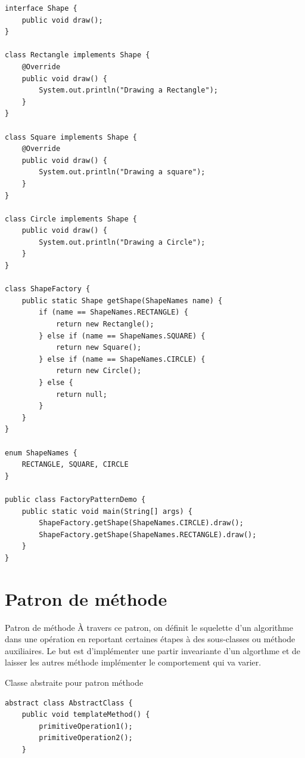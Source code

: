 \documentclass[16pt]{report}
\begin{document}
\begin{multicols*}{2}
\begin{lstlisting}[style=JavaDraculaWhite]
 interface Shape {
    public void draw();
}

class Rectangle implements Shape {
    @Override
    public void draw() {
        System.out.println("Drawing a Rectangle");
    }
}

class Square implements Shape {
    @Override
    public void draw() {
        System.out.println("Drawing a square");
    }
}

class Circle implements Shape {
    public void draw() {
        System.out.println("Drawing a Circle");
    }
}

class ShapeFactory {
    public static Shape getShape(ShapeNames name) {
        if (name == ShapeNames.RECTANGLE) {
            return new Rectangle();
        } else if (name == ShapeNames.SQUARE) {
            return new Square();
        } else if (name == ShapeNames.CIRCLE) {
            return new Circle();
        } else {
            return null;
        }
    }
}

enum ShapeNames {
    RECTANGLE, SQUARE, CIRCLE
}

public class FactoryPatternDemo {
    public static void main(String[] args) {
        ShapeFactory.getShape(ShapeNames.CIRCLE).draw();
        ShapeFactory.getShape(ShapeNames.RECTANGLE).draw();
    }
}    
\end{lstlisting}

        \section{Patron de méthode}
    
        \begin{Concept}{Patron de méthode}{}
            À travers ce patron, on \textcolor{myb}{définit le squelette} d'un algorithme dans une 
            opération en \textcolor{myb}{reportant} certaines étapes à des sous-classes ou 
            méthode auxiliaires. Le but est d'implémenter une partir \textcolor{myb}{inveariante} d'un 
            algorthme et de laisser les autres méthode implémenter le comportement 
            qui va varier. 
        \end{Concept}


        \begin{EExample}{Classe abstraite pour patron méthode}{}

\begin{lstlisting}[style=JavaDraculaWhite]
abstract class AbstractClass {
    public void templateMethod() {
        primitiveOperation1(); 
        primitiveOperation2();
    }


\end{lstlisting}
\end{EExample}
\end{multicols*}
\end{document}
